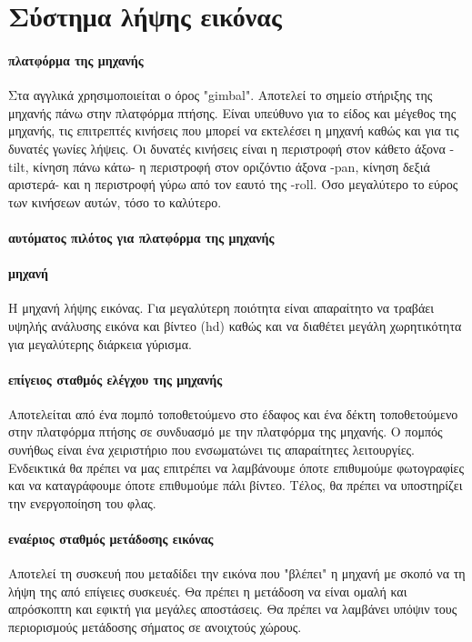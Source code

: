 \documentclass[a4paper, 12pt, twoside]{report}
\begin{document}
{{{{{{			
		\section{Σύστημα λήψης εικόνας}
			\paragraph{πλατφόρμα της μηχανής}{Στα αγγλικά χρησιμοποιείται ο όρος "gimbal". Αποτελεί το σημείο στήριξης της μηχανής πάνω στην πλατφόρμα πτήσης. Είναι υπεύθυνο για το είδος και μέγεθος της μηχανής, τις επιτρεπτές κινήσεις που μπορεί να εκτελέσει η μηχανή καθώς και για τις δυνατές γωνίες λήψεις. Οι δυνατές κινήσεις είναι η περιστροφή στον κάθετο άξονα -tilt, κίνηση πάνω κάτω- η περιστροφή στον οριζόντιο άξονα -pan, κίνηση δεξιά αριστερά- και η περιστροφή γύρω από τον εαυτό της -roll. Όσο μεγαλύτερο το εύρος των κινήσεων αυτών, τόσο το καλύτερο.
			}
			\paragraph{αυτόματος πιλότος για πλατφόρμα της μηχανής}{
			}
			
			\paragraph{μηχανή}{Η μηχανή λήψης εικόνας. Για μεγαλύτερη ποιότητα είναι απαραίτητο να τραβάει υψηλής ανάλυσης εικόνα και βίντεο (hd) καθώς και να διαθέτει μεγάλη χωρητικότητα για μεγαλύτερης διάρκεια γύρισμα.
			}
			\paragraph{επίγειος σταθμός ελέγχου της μηχανής}{Αποτελείται από ένα πομπό τοποθετούμενο στο έδαφος και ένα δέκτη τοποθετούμενο στην πλατφόρμα πτήσης σε συνδυασμό με την πλατφόρμα της μηχανής. Ο πομπός συνήθως είναι ένα χειριστήριο που ενσωματώνει τις απαραίτητες λειτουργίες. Ενδεικτικά θα πρέπει να μας επιτρέπει να λαμβάνουμε όποτε επιθυμούμε φωτογραφίες και να καταγράφουμε όποτε επιθυμούμε πάλι βίντεο. Τέλος, θα πρέπει να υποστηρίζει την ενεργοποίηση του φλας.
			}
			\paragraph{εναέριος σταθμός μετάδοσης εικόνας}{Αποτελεί τη συσκευή που μεταδίδει την εικόνα που "βλέπει" η μηχανή με σκοπό να τη λήψη της από επίγειες συσκευές. Θα πρέπει η μετάδοση να είναι ομαλή και απρόσκοπτη και εφικτή για μεγάλες αποστάσεις. Θα πρέπει να λαμβάνει υπόψιν τους περιορισμούς μετάδοσης σήματος σε ανοιχτούς χώρους.
			}
}}}}}}
\end{document}
